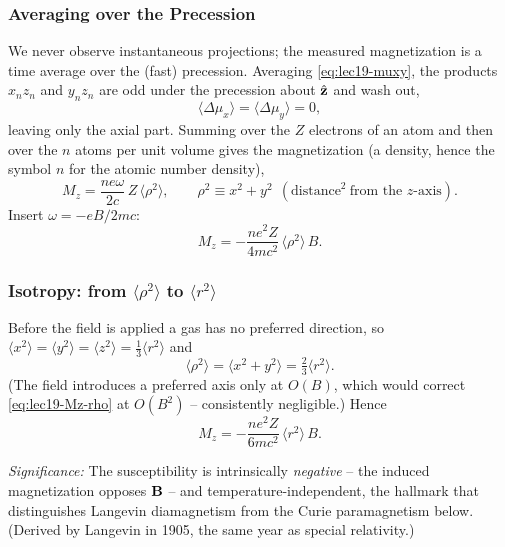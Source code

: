 \subsubsection*{Averaging over the Precession}
We never observe instantaneous projections; the measured magnetization is a time average
over the (fast) precession. Averaging \eqref{eq:lec19-muxy}, the products $x_nz_n$ and
$y_nz_n$ are odd under the precession about $\hat{\mathbf{z}}$ and wash out,
\begin{equation}\label{eq:lec19-xy-vanish}
  \langle\Delta\mu_x\rangle=\langle\Delta\mu_y\rangle=0,
\end{equation}
leaving only the axial part. Summing over the $Z$ electrons of an atom and then over the
$n$ atoms per unit volume gives the magnetization (a density, hence the symbol $n$ for the
atomic number density),
\begin{equation}\label{eq:lec19-Mz-raw}
  M_z=\frac{n e\omega}{2c}\,Z\,\langle\rho^2\rangle,
  \qquad
  \rho^2\equiv x^2+y^2\ \ (\text{distance}^2\ \text{from the }z\text{-axis}).
\end{equation}
Insert $\omega=-eB/2mc$:
\begin{equation}\label{eq:lec19-Mz-rho}
  M_z=-\frac{n e^2 Z}{4 m c^2}\,\langle\rho^2\rangle\,B .
\end{equation}

\subsubsection*{Isotropy: from $\langle\rho^2\rangle$ to $\langle r^2\rangle$}
Before the field is applied a gas has no preferred direction, so
$\langle x^2\rangle=\langle y^2\rangle=\langle z^2\rangle=\tfrac13\langle r^2\rangle$ and
\begin{equation}\label{eq:lec19-rho-to-r}
  \langle\rho^2\rangle=\langle x^2+y^2\rangle=\tfrac23\langle r^2\rangle .
\end{equation}
(The field introduces a preferred axis only at $O(B)$, which would correct
\eqref{eq:lec19-Mz-rho} at $O(B^2)$ -- consistently negligible.) Hence
\begin{equation}\label{eq:lec19-Mz-final}
  M_z=-\frac{n e^2 Z}{6 m c^2}\,\langle r^2\rangle\,B .
\end{equation}

\textit{Significance:} The susceptibility is intrinsically \emph{negative} -- the induced
magnetization opposes $\mathbf{B}$ -- and temperature-independent, the hallmark that
distinguishes Langevin diamagnetism from the Curie paramagnetism below. (Derived by
Langevin in 1905, the same year as special relativity.)

